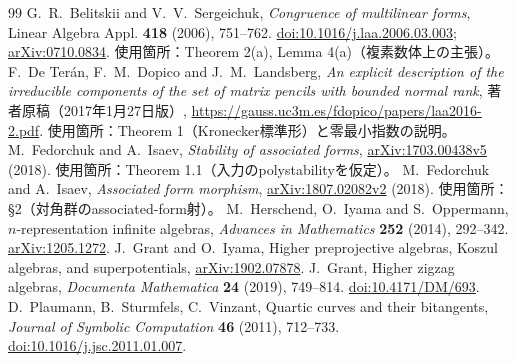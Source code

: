 \documentclass[11pt,a4paper]{ltjsarticle}
\theoremstyle{definition}
\begin{document}
\begin{thebibliography}{99}
 G.~R.~Belitskii and V.~V.~Sergeichuk,
\emph{Congruence of multilinear forms}, Linear Algebra Appl. \textbf{418} (2006), 751--762.
\href{https://doi.org/10.1016/j.laa.2006.03.003}{doi:10.1016/j.laa.2006.03.003};
\href{https://arxiv.org/abs/0710.0834}{arXiv:0710.0834}.
使用箇所：Theorem 2(a), Lemma 4(a)（複素数体上の主張）。
 F.~De Ter\'an, F.~M.~Dopico and J.~M.~Landsberg,
\emph{An explicit description of the irreducible components of the set of matrix pencils with bounded normal rank},
著者原稿（2017年1月27日版）,
\url{https://gauss.uc3m.es/fdopico/papers/laa2016-2.pdf}.
使用箇所：Theorem 1（Kronecker標準形）と零最小指数の説明。
 M.~Fedorchuk and A.~Isaev,
\emph{Stability of associated forms},
\href{https://arxiv.org/abs/1703.00438v5}{arXiv:1703.00438v5} (2018).
使用箇所：Theorem 1.1（入力のpolystabilityを仮定）。
 M.~Fedorchuk and A.~Isaev,
\emph{Associated form morphism},
\href{https://arxiv.org/abs/1807.02082v2}{arXiv:1807.02082v2} (2018).
使用箇所：\S2（対角群のassociated-form射）。
M.~Herschend, O.~Iyama and S.~Oppermann, $n$-representation infinite algebras,
\emph{Advances in Mathematics} \textbf{252} (2014), 292--342.
\href{https://arxiv.org/abs/1205.1272}{arXiv:1205.1272}.
J.~Grant and O.~Iyama, Higher preprojective algebras, Koszul algebras, and superpotentials,
\href{https://arxiv.org/abs/1902.07878}{arXiv:1902.07878}.
J.~Grant, Higher zigzag algebras,
\emph{Documenta Mathematica} \textbf{24} (2019), 749--814.
\href{https://doi.org/10.4171/DM/693}{doi:10.4171/DM/693}.
D.~Plaumann, B.~Sturmfels, C.~Vinzant, Quartic curves and their bitangents,
\emph{Journal of Symbolic Computation} \textbf{46} (2011), 712--733.
\href{https://doi.org/10.1016/j.jsc.2011.01.007}{doi:10.1016/j.jsc.2011.01.007}.
\end{thebibliography}
\end{document}
